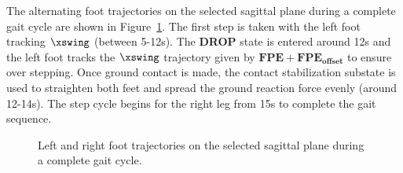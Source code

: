 The alternating foot trajectories on the selected sagittal plane during a complete gait cycle are shown in Figure~\ref{fig:fwdfoottraj}. The first step is taken with the left foot tracking $\xswing$ (between 5-12s). The \textbf{DROP} state is entered around 12s and the left foot tracks the $\xswing$ trajectory given by $\mathbf{FPE} + \mathbf{FPE_{offset}}$ to ensure over stepping. Once ground contact is made, the contact stabilization substate is used to straighten both feet and spread the ground reaction force evenly (around 12-14s). The step cycle begins for the right leg from 15s to complete the gait sequence. 

\begin{figure}[!b]
	\begin{center}
	\end{center}
  	\caption{Left and right foot trajectories on the selected sagittal plane during a complete gait cycle.}
	\label{fig:fwdfoottraj}
\end{figure}


